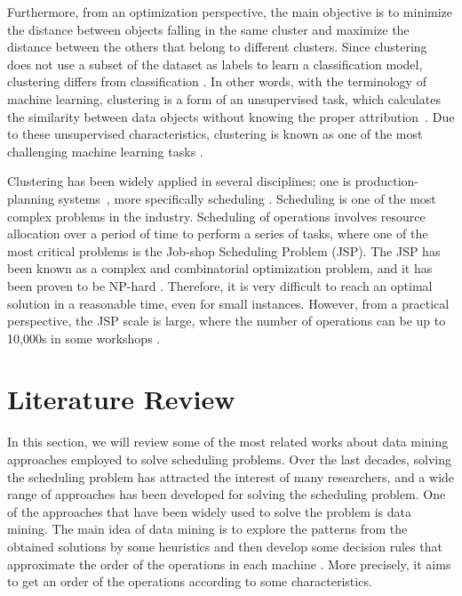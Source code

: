 \documentclass{article}
\newcommand{\comment}[1]{\todo[inline]{#1}}
\begin{document}
Furthermore, from an optimization perspective, the main objective is to minimize the distance between objects falling in the same cluster and maximize the distance between the others that belong to different clusters. Since clustering does not use a subset of the dataset as labels to learn a classification model, clustering differs from classification \cite{wagstaff2001constrained}. In other words, with the terminology of machine learning, clustering is a form of an unsupervised task, which calculates the similarity between data objects without knowing the proper attribution~\cite{li2018geometric}. Due to these unsupervised characteristics, clustering is known as one of the most challenging machine learning tasks \cite{benabdellah2019survey}.

Clustering has been widely applied in several disciplines; one is production-planning systems~\cite{nananukul2013clustering,koskosidis1992clustering}, more specifically scheduling \cite{yashar2013multi,tong2016research}. 
Scheduling is one of the most complex problems in the industry. Scheduling of operations involves resource allocation over a period of time to perform a series of tasks, where one of the most critical problems is the Job-shop Scheduling Problem (JSP). The JSP has been known as a complex and combinatorial optimization problem, and it has been proven to be NP-hard \cite{baker1974introduction,lenstra1979computational}. Therefore, it is very difficult to reach an optimal solution in a reasonable time, even for small instances. However, from a practical perspective, the JSP scale is large, where the number of operations can be up to 10,000s in some workshops \cite{zhang2010hybrid}.

\section{Literature Review}
In this section, we will review some of the most related works about data mining approaches employed to solve scheduling problems. Over the last decades, solving the scheduling problem has attracted the interest of many researchers, and a wide range of approaches has been developed for solving the scheduling problem. One of the approaches that have been widely used to solve the problem is data mining. The main idea of data mining is to explore the patterns from the obtained solutions by some heuristics and then develop some decision rules that approximate the order of the operations in each machine \cite{ismail2012production}. More precisely, it aims to get an order of the operations according to some characteristics.\\
\end{document}
